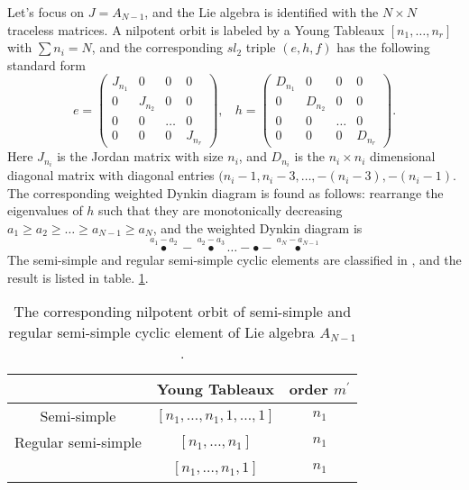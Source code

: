 \documentclass[a4paper,11pt]{article}
\begin{document}
Let's focus on $J=A_{N-1}$, and the Lie algebra is identified with the $N\times N$ traceless matrices. A nilpotent orbit is labeled by a Young Tableaux $[n_1,  \ldots, n_r]$ with $\sum n_i=N$, and  the corresponding $sl_2$ triple $(e,h,f)$ has the following standard form 
\begin{equation}
e=\left(\begin{array}{cccc}
J_{n_1}&0&0&0\\
0&J_{n_2} &0&0\\
0&0&\ldots &0 \\
0&0&0&J_{n_r} 
\end{array}\right), ~~~~
h=\left(\begin{array}{cccc}
D_{n_1}&0&0&0\\
0&D_{n_2} &0&0\\
0&0&\ldots &0 \\
0&0&0&D_{n_r} 
\end{array}\right). 
 \end{equation}
Here $J_{n_i}$ is the Jordan matrix with size $n_i$, and $D_{n_i}$ is the $n_i\times n_i$ dimensional diagonal matrix with diagonal entries $(n_i-1, n_i-3,\ldots,-(n_i-3),-(n_i-1)$.  The corresponding weighted Dynkin diagram is found as follows: rearrange the eigenvalues of $h$ such that 
they are monotonically decreasing $a_1\geq a_2 \geq  \ldots \geq a_{N-1}\geq a_N$, and the weighted Dynkin diagram is 
\begin{equation}
\overset{a_1-a_2}{\bullet}-\overset{a_2-a_3}{\bullet}\ldots- \bullet - \overset{a_N-a_{N-1}}{\bullet}
\end{equation}
The  semi-simple and regular semi-simple cyclic elements are classified in \cite{elashvili2013cyclic}, and the result is listed in table. \ref{cyclic}. 

\begin{table}
\begin{center}
\begin{tabular}{|c|c|c|}
  \hline
~ & Young Tableaux & order $m^{'}$ \\ \hline
      Semi-simple &$ [n_1,\ldots, n_1, 1,\ldots,1 ]$  & $n_1$ \\ \hline
        Regular semi-simple & $ [n_1,\ldots, n_1] $   &    $n_1$ \\ \hline
        ~&$[n_1,\ldots,n_1,1]$& $n_1$ \\ \hline
\end{tabular} 
\end{center}
\caption{The corresponding nilpotent orbit of semi-simple and regular semi-simple cyclic element of  Lie algebra $A_{N-1}$.}
\label{cyclic}
\end{table}
\end{document}
